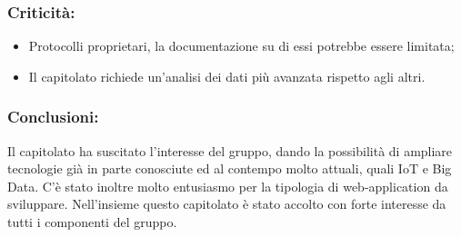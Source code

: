 	\subsubsection{Criticità:}
	\begin{itemize}
		\item Protocolli proprietari, la documentazione su di essi potrebbe essere limitata;
		\item Il capitolato richiede un'analisi dei dati più avanzata rispetto agli altri.
	\end{itemize}
	
	\subsubsection{Conclusioni:}
	Il capitolato ha suscitato l'interesse del gruppo, dando la possibilità di ampliare tecnologie già in parte conosciute ed al contempo molto attuali, quali IoT e Big Data. C'è stato inoltre molto entusiasmo per la tipologia di web-application da sviluppare. Nell'insieme questo capitolato è stato accolto con forte interesse da tutti i componenti del gruppo.

